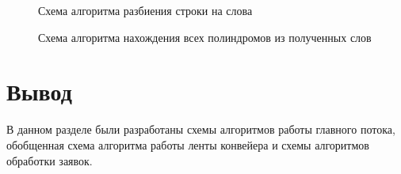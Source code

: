 \begin{figure}
	\caption{Схема алгоритма разбиения строки на слова}
	\label{getWords}
\end{figure}

\begin{figure}
	\caption{Схема алгоритма нахождения всех полиндромов из полученных слов}
	\label{getPolinoms}
\end{figure}

\newpage
\section{Вывод}
В данном разделе были разработаны схемы алгоритмов работы главного потока, обобщенная схема алгоритма работы ленты конвейера и схемы алгоритмов обработки заявок.